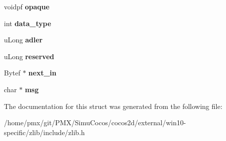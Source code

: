 \begin{DoxyCompactItemize}
voidpf {\bfseries opaque}
\item 
\mbox{\label{structz__stream__s_a9d8f63877d7639a8bca60f9fc3704fc4}} 
int {\bfseries data\+\_\+type}
\item 
\mbox{\label{structz__stream__s_ade2217fe31e671be1257731883201223}} 
u\+Long {\bfseries adler}
\item 
\mbox{\label{structz__stream__s_add73791dd19b49c9c68f3f3d328c37db}} 
u\+Long {\bfseries reserved}
\item 
\mbox{\label{structz__stream__s_a21d2c026f0f2fcd67f33011231f8ed00}} 
Bytef $\ast$ {\bfseries next\+\_\+in}
\item 
\mbox{\label{structz__stream__s_a9b2f745fc780e3b33e2935f8c650a326}} 
char $\ast$ {\bfseries msg}
\end{DoxyCompactItemize}


The documentation for this struct was generated from the following file\+:\begin{DoxyCompactItemize}
\item 
/home/pmx/git/\+P\+M\+X/\+Simu\+Cocos/cocos2d/external/win10-\/specific/zlib/include/zlib.\+h\end{DoxyCompactItemize}
